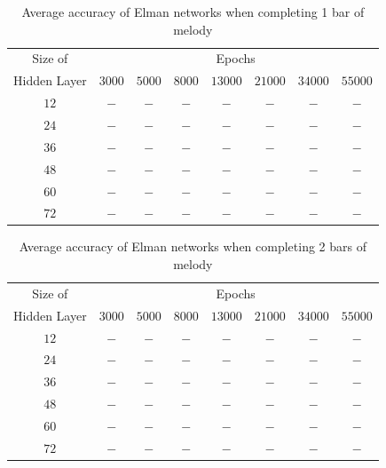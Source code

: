 \documentclass[ author={Stephen Livermore-Tozer},
				supervisor={Dr. Peter Flach},
				degree={MEng},
				title={Algorithmic Co-composition Using Machine Learning},
				subtitle={},
				type={research},
				year={2016} ]{dissertation}
\begin{document}
	\begin{table}[htp]
		\begin{center}
			\begin{tabular}{cccccccc}
				\toprule
				Size of& \multicolumn{7}{c}{Epochs}\\
				\cline{2-8}
				Hidden Layer& $3000$ & $5000$ & $8000$ & $13000$ & $21000$ & $34000$ & $55000$\\
				\hline
				$12$ & $-$ & $-$ & $-$ & $-$ & $-$ & $-$ & $-$\\
				$24$ & $-$ & $-$ & $-$ & $-$ & $-$ & $-$ & $-$\\
				$36$ & $-$ & $-$ & $-$ & $-$ & $-$ & $-$ & $-$\\
				$48$ & $-$ & $-$ & $-$ & $-$ & $-$ & $-$ & $-$\\
				$60$ & $-$ & $-$ & $-$ & $-$ & $-$ & $-$ & $-$\\
				$72$ & $-$ & $-$ & $-$ & $-$ & $-$ & $-$ & $-$\\
				\bottomrule
			\end{tabular}
		\end{center}
		\caption{Average accuracy of Elman networks when completing 1 bar of melody}
		\label{tab:elman-1-bar-results}
	\end{table}
	
	\begin{table}[htp]
		\begin{center}
			\begin{tabular}{cccccccc}
				\toprule
				Size of& \multicolumn{7}{c}{Epochs}\\
				\cline{2-8}
				Hidden Layer& $3000$ & $5000$ & $8000$ & $13000$ & $21000$ & $34000$ & $55000$\\
				\hline
				$12$ & $-$ & $-$ & $-$ & $-$ & $-$ & $-$ & $-$\\
				$24$ & $-$ & $-$ & $-$ & $-$ & $-$ & $-$ & $-$\\
				$36$ & $-$ & $-$ & $-$ & $-$ & $-$ & $-$ & $-$\\
				$48$ & $-$ & $-$ & $-$ & $-$ & $-$ & $-$ & $-$\\
				$60$ & $-$ & $-$ & $-$ & $-$ & $-$ & $-$ & $-$\\
				$72$ & $-$ & $-$ & $-$ & $-$ & $-$ & $-$ & $-$\\
				\bottomrule
			\end{tabular}
		\end{center}
		\caption{Average accuracy of Elman networks when completing 2 bars of melody}
		\label{tab:elman-2-bar-results}
	\end{table}
	
\end{document}
